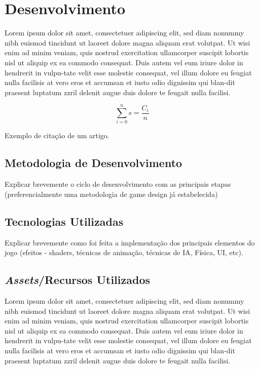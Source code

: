 \section{Desenvolvimento}
\label{secao:desenvolvimento}
Lorem ipsum dolor sit amet, consectetuer adipiscing elit, sed diam nonummy nibh euismod tincidunt ut laoreet dolore magna aliquam erat volutpat. Ut wisi enim ad minim veniam, quis nostrud exercitation ullamcorper suscipit lobortis nisl ut aliquip ex ea commodo consequat. Duis autem vel eum iriure dolor in hendrerit in vulpu-tate velit esse molestie consequat, vel illum dolore eu feugiat nulla facilisis at vero eros et accumsan et iusto odio dignissim qui blan-dit praesent luptatum zzril delenit augue duis dolore te feugait nulla facilisi.


\begin{equation}
 \sum_{i=0}^{n} s = \frac{C_{i}}{n}
\end{equation}

Exemplo de citação de um artigo\cite{Nielson:1991:TAD}.

\subsection{Metodologia de Desenvolvimento}
\label{secao:metodologia_de_desenvolvimento}
Explicar brevemente o ciclo de desenvolvimento com as principais etapas (preferencialmente uma metodologia de game design já estabelecida)

\subsection{Tecnologias Utilizadas}
\label{secao:tecnologias_utilizadas}
Explicar brevemente como foi feita a implementação dos principais elementos do jogo (efeitos - shaders, técnicas de animação, técnicas de IA, Física, UI, etc).


\subsection{\textit{Assets}/Recursos Utilizados}
\label{secao:assets_recursos_utilizados}
Lorem ipsum dolor sit amet, consectetuer adipiscing elit, sed diam nonummy nibh euismod tincidunt ut laoreet dolore magna aliquam erat volutpat. Ut wisi enim ad minim veniam, quis nostrud exercitation ullamcorper suscipit lobortis nisl ut aliquip ex ea commodo consequat. Duis autem vel eum iriure dolor in hendrerit in vulpu-tate velit esse molestie consequat, vel illum dolore eu feugiat nulla facilisis at vero eros et accumsan et iusto odio dignissim qui blan-dit praesent luptatum zzril delenit augue duis dolore te feugait nulla facilisi.

